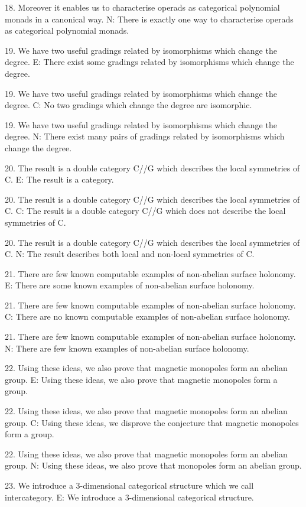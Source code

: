 18.  Moreover it enables us to characterise operads as categorical polynomial monads in a canonical way.
N: There is exactly one way to characterise operads as categorical polynomial monads.

19. We have two useful gradings related by isomorphisms which change the degree.
E: There exist some gradings related by isomorphisms which change the degree.

19. We have two useful gradings related by isomorphisms which change the degree.
C: No two gradings which change the degree are isomorphic.

19. We have two useful gradings related by isomorphisms which change the degree.
N: There exist many pairs of gradings related by isomorphisms which change the degree.

20.  The result is a double category C//G which describes the local symmetries of C.
E: The result is a category.

20.  The result is a double category C//G which describes the local symmetries of C.
C:  The result is a double category C//G which does not describe the local symmetries of C.

20. The result is a double category C//G which describes the local symmetries of C.
N: The result describes both local and non-local symmetries of C.

21. There are few known computable examples of non-abelian surface holonomy.
E: There are some known examples of non-abelian surface holonomy.

21. There are few known computable examples of non-abelian surface holonomy.
C: There are no known computable examples of non-abelian surface holonomy.

21. There are few known computable examples of non-abelian surface holonomy.
N: There are few known examples of non-abelian surface holonomy.

22. Using these ideas, we also prove that magnetic monopoles form an abelian group.
E:  Using these ideas, we also prove that magnetic monopoles form a group.

22. Using these ideas, we also prove that magnetic monopoles form an abelian group.
C:  Using these ideas, we disprove the conjecture that magnetic monopoles form a group.

22. Using these ideas, we also prove that magnetic monopoles form an abelian group.
N: Using these ideas, we also prove that monopoles form an abelian group.

23.  We introduce a 3-dimensional categorical structure which we call intercategory.
E: We introduce a 3-dimensional categorical structure.

